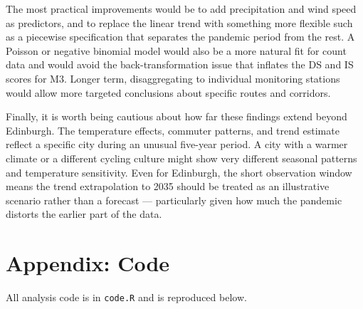 \documentclass[
]{article}
\begin{document}
The most practical improvements would be to add precipitation and wind speed as predictors, and to replace the linear trend with something more flexible such as a piecewise specification that separates the pandemic period from the rest. A Poisson or negative binomial model would also be a more natural fit for count data and would avoid the back-transformation issue that inflates the DS and IS scores for M3. Longer term, disaggregating to individual monitoring
stations would allow more targeted conclusions about specific routes and corridors.

Finally, it is worth being cautious about how far these findings extend beyond Edinburgh. The temperature effects, commuter patterns, and trend estimate reflect a specific city during an unusual five-year period. A city with a warmer climate or a different cycling culture might show very different seasonal patterns and temperature sensitivity. Even for Edinburgh, the short observation window means the trend extrapolation to 2035 should be treated as an illustrative scenario rather than a forecast --- particularly given how much
the pandemic distorts the earlier part of the data.

\section{Appendix: Code}\label{appendix-code}

All analysis code is in \texttt{code.R} and is reproduced below.
\end{document}
